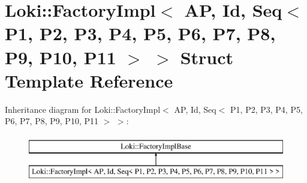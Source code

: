 \hypertarget{structLoki_1_1FactoryImpl_3_01AP_00_01Id_00_01Seq_3_01P1_00_01P2_00_01P3_00_01P4_00_01P5_00_01P6938401cd8a7393dd2aec76a5416e9a38}{}\section{Loki\+:\+:Factory\+Impl$<$ A\+P, Id, Seq$<$ P1, P2, P3, P4, P5, P6, P7, P8, P9, P10, P11 $>$ $>$ Struct Template Reference}
\label{structLoki_1_1FactoryImpl_3_01AP_00_01Id_00_01Seq_3_01P1_00_01P2_00_01P3_00_01P4_00_01P5_00_01P6938401cd8a7393dd2aec76a5416e9a38}
Inheritance diagram for Loki\+:\+:Factory\+Impl$<$ A\+P, Id, Seq$<$ P1, P2, P3, P4, P5, P6, P7, P8, P9, P10, P11 $>$ $>$\+:\begin{figure}[H]
\begin{center}
\leavevmode
\includegraphics[height=2.000000cm]{structLoki_1_1FactoryImpl_3_01AP_00_01Id_00_01Seq_3_01P1_00_01P2_00_01P3_00_01P4_00_01P5_00_01P6938401cd8a7393dd2aec76a5416e9a38}
\end{center}
\end{figure}
